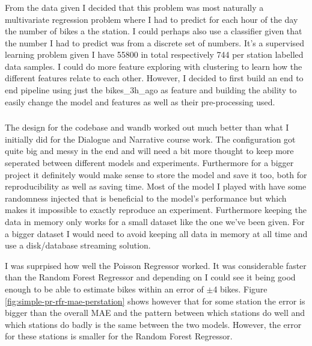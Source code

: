 \documentclass[a4paper]{article}
\begin{document}
        \subsubsection*{}
        From the data given I decided that this problem was most naturally a multivariate regression problem where I had to
        predict for each hour of the day the number of bikes a the station. I could perhaps also use a classifier given that
        the number I had to predict was from a discrete set of numbers. It's a supervised learning problem given I have 55800
        in total respectively 744 per station labelled data samples. I could do more feature exploring with clustering to
        learn how the different features relate to each other. However, I decided to first build an end to end pipeline using
        just the bikes\_3h\_ago as feature and building the ability to easily change the model and features as well as their
        pre-processing used.

        \subsubsection*{}
        The design for the codebase and wandb worked out much better than what I initially did for the Dialogue and Narrative
        course work. The configuration got quite big and messy in the end and will need a bit more thought to
        keep more seperated between different models and experiments. Furthermore for a bigger project it definitely would
        make sense to store the model and save it too, both for
        reproducibility as well as saving time. Most of the model I played with have some randomness injected that is
        beneficial to the model's performance but which makes it impossible to exactly reproduce an experiment. Furthermore
        keeping the data in memory only works for a small dataset like the one we've been given. For a bigger dataset I
        would need to avoid keeping all data in memory at all time and use a disk/database streaming solution.

        I was suprpised how well the Poisson Regressor worked. It was considerable faster than the Random Forest Regressor
        and depending on I could see it being good enough to be able to estimate bikes within an error of $\pm$4 bikes.
        Figure \ref{fig:simple-pr-rfr-mae-perstation} shows however that for some station the error is bigger
        than the overall MAE and the pattern between which stations do well and which stations do badly is the same between the
        two models. However, the error for these stations is smaller for the Random Forest Regressor.
\end{document}

